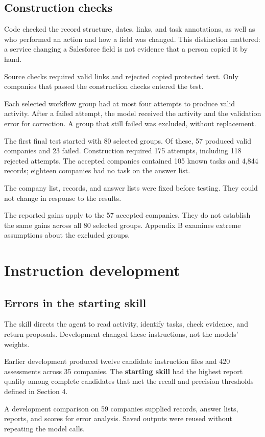 \documentclass[11pt]{article}
\begin{document}
\subsection{Construction checks}
Code checked the record structure, dates, links, and task annotations, as well as who performed an action and how a field was changed. This distinction mattered: a service changing a Salesforce field is not evidence that a person copied it by hand.

Source checks required valid links and rejected copied protected text. Only companies that passed the construction checks entered the test.

Each selected workflow group had at most four attempts to produce valid activity. After a failed attempt, the model received the activity and the validation error for correction. A group that still failed was excluded, without replacement.

The first final test started with 80 selected groups. Of these, 57 produced valid companies and 23 failed. Construction required 175 attempts, including 118 rejected attempts. The accepted companies contained 105 known tasks and 4,844 records; eighteen companies had no task on the answer list.

The company list, records, and answer lists were fixed before testing. They could not change in response to the results.

The reported gains apply to the 57 accepted companies. They do not establish the same gains across all 80 selected groups. Appendix B examines extreme assumptions about the excluded groups.

\section{Instruction development}
\subsection{Errors in the starting skill}
The skill directs the agent to read activity, identify tasks, check evidence, and return proposals. Development changed these instructions, not the models' weights.

Earlier development produced twelve candidate instruction files and 420 assessments across 35 companies. The \textbf{starting skill} had the highest report quality among complete candidates that met the recall and precision thresholds defined in Section 4.

A development comparison on 59 companies supplied records, answer lists, reports, and scores for error analysis. Saved outputs were reused without repeating the model calls.
\end{document}
